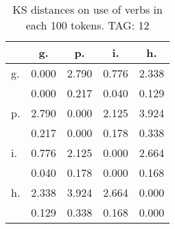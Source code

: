 \begin{table}[h!]
\begin{center}
\begin{tabular}{| l | c | c | c | c |}\hline
 & g. & p. & i. & h. \\\hline
g. & 0.000  & 2.790  & 0.776  & 2.338 \\\hline
 & 0.000  & 0.217  & 0.040  & 0.129 \\\hline
p. & 2.790  & 0.000  & 2.125  & 3.924 \\\hline
 & 0.217  & 0.000  & 0.178  & 0.338 \\\hline
i. & 0.776  & 2.125  & 0.000  & 2.664 \\\hline
 & 0.040  & 0.178  & 0.000  & 0.168 \\\hline
h. & 2.338  & 3.924  & 2.664  & 0.000 \\\hline
 & 0.129  & 0.338  & 0.168  & 0.000 \\\hline
\end{tabular}
\caption{KS distances on use of verbs in each 100 tokens. TAG: 12}
\end{center}
\end{table}